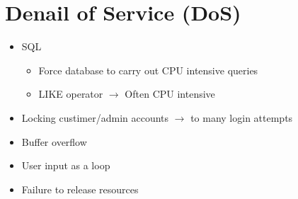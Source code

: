 \section{Denail of Service (DoS)}
	\begin{itemize}
		\item SQL 
			\begin{itemize}
				\item Force database to carry out CPU intensive queries
				\item LIKE operator $\rightarrow$ Often CPU intensive 
			\end{itemize}
		\item Locking custimer/admin accounts $\rightarrow$ to many login attempts
		\item Buffer overflow
		\item User input as a loop
		\item Failure to release resources
	\end{itemize}
